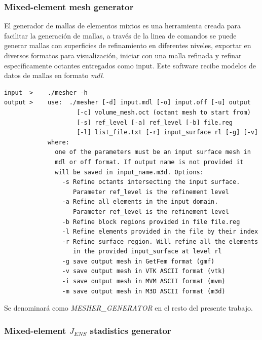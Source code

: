 \subsubsection{Mixed-element mesh generator} \label{section:mesh_generator_definition}

El generador de mallas de elementos mixtos \cite{lobos2015mixed} es una herramienta creada para facilitar la generación de mallas, a través de la linea de comandos se puede generar mallas con superficies de refinamiento en diferentes niveles, exportar en diversos formatos para visualización, iniciar con una malla refinada y refinar específicamente octantes entregados como input.
Este software recibe modelos de datos de mallas en formato \textit{mdl}.

\begin{lstlisting}[style=Console,caption={Opciones de mesher generator.\\ Fuente: Elaboración propia.}]
input  >    ./mesher -h
output >    use:  ./mesher [-d] input.mdl [-o] input.off [-u] output
                    [-c] volume_mesh.oct (octant mesh to start from)
                    [-s] ref_level [-a] ref_level [-b] file.reg 
                    [-l] list_file.txt [-r] input_surface rl [-g] [-v]
            where:
              one of the parameters must be an input surface mesh in
              mdl or off format. If output name is not provided it
              will be saved in input_name.m3d. Options:
                -s Refine octants intersecting the input surface.
                   Parameter ref_level is the refinement level
                -a Refine all elements in the input domain.
                   Parameter ref_level is the refinement level
                -b Refine block regions provided in file file.reg
                -l Refine elements provided in the file by their index
                -r Refine surface region. Will refine all the elements
                   in the provided input_surface at level rl
                -g save output mesh in GetFem format (gmf)
                -v save output mesh in VTK ASCII format (vtk)
                -i save output mesh in MVM ASCII format (mvm)
                -m save output mesh in M3D ASCII format (m3d)
\end{lstlisting}

Se denominará como \textit{MESHER\_GENERATOR} en el resto del presente trabajo.

\subsubsection{Mixed-element $J_{ENS}$ stadistics generator}

